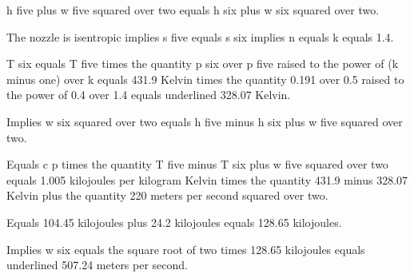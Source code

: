 h five plus w five squared over two equals h six plus w six squared over two.

The nozzle is isentropic implies s five equals s six implies n equals k equals 1.4.

T six equals T five times the quantity p six over p five raised to the power of (k minus one) over k equals 431.9 Kelvin times the quantity 0.191 over 0.5 raised to the power of 0.4 over 1.4 equals underlined 328.07 Kelvin.

Implies w six squared over two equals h five minus h six plus w five squared over two.

Equals c p times the quantity T five minus T six plus w five squared over two equals 1.005 kilojoules per kilogram Kelvin times the quantity 431.9 minus 328.07 Kelvin plus the quantity 220 meters per second squared over two.

Equals 104.45 kilojoules plus 24.2 kilojoules equals 128.65 kilojoules.

Implies w six equals the square root of two times 128.65 kilojoules equals underlined 507.24 meters per second.